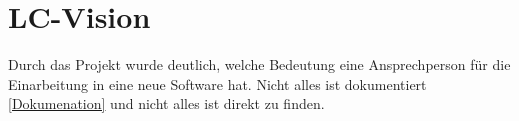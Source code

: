 \documentclass[12pt,a4paper]{article}
\begin{document}
\section{LC-Vision}
Durch das Projekt wurde deutlich, welche Bedeutung eine Ansprechperson für die Einarbeitung in eine neue Software hat. Nicht alles ist dokumentiert \ref{Dokumenation} und nicht alles ist direkt zu finden. 
\newpage


\end{document}
